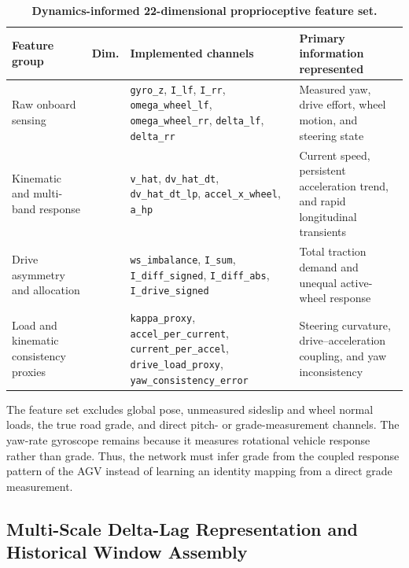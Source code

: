\documentclass{ieeeaccess}
\begin{document}
\begin{table}[!t]
\centering
\caption{\textbf{Dynamics-informed 22-dimensional proprioceptive feature set.}}
\label{tab:feature_contract_22d}
\setlength{\tabcolsep}{3pt}
\begin{tabular}{|>{\raggedright\arraybackslash}p{}|>{\centering\arraybackslash}p{}|>{\raggedright\arraybackslash}p{}|>{\raggedright\arraybackslash}p{}|}
\hline
Feature group & Dim. & Implemented channels & Primary information represented \\
\hline
Raw onboard sensing & 7 & \texttt{gyro\_z}, \texttt{I\_lf}, \texttt{I\_rr}, \texttt{omega\_wheel\_lf}, \texttt{omega\_wheel\_rr}, \texttt{delta\_lf}, \texttt{delta\_rr} & Measured yaw, drive effort, wheel motion, and steering state \\
Kinematic and multi-band response & 5 & \texttt{v\_hat}, \texttt{dv\_hat\_dt}, \texttt{dv\_hat\_dt\_lp}, \texttt{accel\_x\_wheel}, \texttt{a\_hp} & Current speed, persistent acceleration trend, and rapid longitudinal transients \\
Drive asymmetry and allocation & 5 & \texttt{ws\_imbalance}, \texttt{I\_sum}, \texttt{I\_diff\_signed}, \texttt{I\_diff\_abs}, \texttt{I\_drive\_signed} & Total traction demand and unequal active-wheel response \\
Load and kinematic consistency proxies & 5 & \texttt{kappa\_proxy}, \texttt{accel\_per\_current}, \texttt{current\_per\_accel}, \texttt{drive\_load\_proxy}, \texttt{yaw\_consistency\_error} & Steering curvature, drive--acceleration coupling, and yaw inconsistency \\
\hline
\end{tabular}
\end{table}

The feature set excludes global pose, unmeasured sideslip and wheel normal loads, the true road grade, and direct pitch- or grade-measurement channels. The yaw-rate gyroscope remains because it measures rotational vehicle response rather than grade. Thus, the network must infer grade from the coupled response pattern of the AGV instead of learning an identity mapping from a direct grade measurement.

\subsection{Multi-Scale Delta-Lag Representation and Historical Window Assembly}
\end{document}
